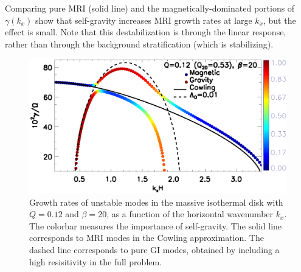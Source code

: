 %

Comparing pure MRI (solid line) and the magnetically-dominated
portions of $\gamma(k_x)$ show that self-gravity increases MRI growth
rates at large $k_x$, but the effect is small. %
Note that this 
destabilization is through the linear response, rather than through
the background stratification (which is stabilizing). 


\begin{figure}
  \includegraphics[width=\linewidth]{figures/compare_growth3_Q0d12_B20.ps}  
  \caption{Growth rates of unstable modes in the massive isothermal
    disk with $Q=0.12$ and $\beta=20$, as a function of the horizontal
    wavenumber $k_x$. The colorbar measures the importance of
    self-gravity. The solid line corresponds to MRI modes in the
    Cowling approximation. The dashed line corresponds to pure GI
    modes, obtained by including a high resisitivity in the full
    problem. 
    \label{compare_growth3_Q01d2}}
\end{figure}



